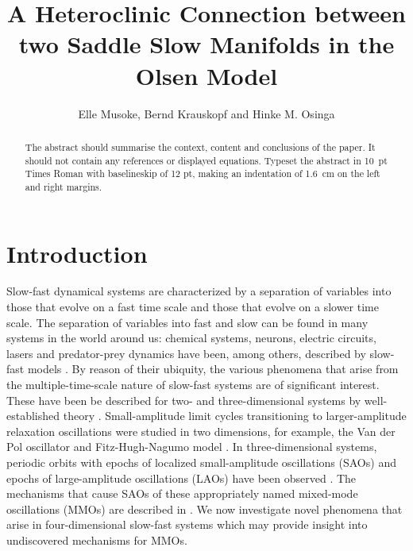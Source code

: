 \documentclass{ws-ijbc}
\begin{document}
\catchline{}{}{}{}{} %


\title{A Heteroclinic Connection between two Saddle Slow Manifolds in the Olsen Model}

\author{Elle Musoke, Bernd Krauskopf and Hinke M. Osinga}

\address{Department of Mathematics, University of Auckland, Private Bag 92019\\
Auckland, 1142, New Zealand\\
elle.musoke@auckland.ac.nz}

\maketitle

\begin{history}
\end{history}

\begin{abstract}
The abstract should summarise the context, content and conclusions
of the paper. It should not contain any references or displayed
equations. Typeset the abstract in 10~pt Times Roman with
baselineskip of 12 pt, making an indentation of 1.6~cm on the left
and right margins.
\end{abstract}

\section{Introduction}

Slow-fast dynamical systems are characterized by a separation of variables into those that evolve on a fast time scale and those that evolve on a slower time scale.  The separation of variables into fast and slow can be found in many systems in the world around us: chemical systems, neurons, electric circuits, lasers and predator-prey dynamics have been, among others, described by slow-fast models  \cite{BZ_reaction, Neurons,Circuits, lasers, Predator-Prey}.  By reason of their ubiquity, the various phenomena that arise from the multiple-time-scale nature of slow-fast systems are of significant interest. These have been be described for two- and three-dimensional systems by well-established theory \cite{canard_explosion, lents-rapides, enlacement,singular_hopf, folded_node,three}.  Small-amplitude limit cycles transitioning to larger-amplitude relaxation oscillations were studied in two dimensions, for example, the Van der Pol oscillator and Fitz-Hugh-Nagumo model \cite{canard_explosion, fitz-hugh-nagumo}.  In three-dimensional systems, periodic orbits with epochs of localized small-amplitude oscillations (SAOs) and epochs of large-amplitude oscillations (LAOs) have been observed \cite{BZ}.  The mechanisms that cause SAOs of these appropriately named mixed-mode oscillations (MMOs) are described in \cite{MMO}.  We now investigate novel phenomena that arise in four-dimensional slow-fast systems which may provide insight into undiscovered mechanisms for MMOs.
\end{document}
